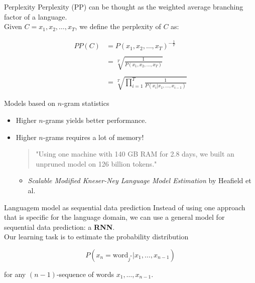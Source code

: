 \documentclass[10pt]{beamer}
\begin{document}
\begin{frame}{Perplexity}
\alert{Perplexity (PP)} can be thought as the weighted average branching factor of a language.\\


Given $C= x_1, x_2, \dots, x_T$, we define the perplexity of $C$ as:

\begin{align*}
PP(C) &= P(x_1, x_2, \dots, x_T)^{-\frac{1}{T}}\\
	  & \\
      &= \sqrt[T]{\frac{1}{P(x_1, x_2, \dots, x_T)}}\\
      & \\
      &= \sqrt[T]{\prod_{i=1}^{T}\frac{1}{P(x_i \vert x_1,\dots, x_{i-1})}}
\end{align*}
\end{frame}

\begin{frame}{Models based on $n$-gram statistics}
\begin{itemize}
\item Higher $n$-grams yields better performance.
\vspace{0.7cm}
\item Higher $n$-grams requires a lot of memory!
\vspace{0.1cm}
\begin{quote}
"Using one machine \alert{with 140 GB
RAM for 2.8 days}, we built an unpruned
model on 126 billion tokens."
\end{quote}
\begin{itemize}
\item [] \textit{Scalable Modified Kneser-Ney Language Model Estimation} by Heafield et al.
\end{itemize}
\end{itemize}
\end{frame}



\begin{frame}{Languagem model as sequential data prediction}
Instead of using one approach that is specific for the language domain, we can use a general model for sequential data prediction: a \textbf{RNN}. \\

Our learning task is to estimate the probability distribution 

\[
P(x_{n} = \text{word}_{j^{*}} | x_{1}, \dots ,x_{n-1})
\]

for any $(n-1)$-sequence of words $x_{1}, \dots ,x_{n-1}$.
\end{frame}
\end{document}

